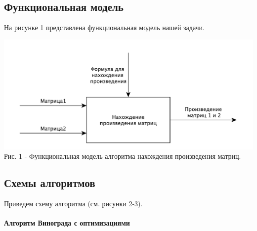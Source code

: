 \documentclass[a4paper,14pt]{article} %
\begin{document}
	\subsection{Функциональная модель}
	На рисунке 1 представлена функциональная модель нашей задачи.  
	\begin{center}
		\includegraphics[scale = 0.8]{idef0} \\ Рис.  1 - Функциональная модель алгоритма нахождения произведения матриц. 
	\end{center}
	
        
        \subsection{Схемы алгоритмов}
        \hfill
        
        Приведем схему алгоритма (см. рисунки 2-3). 
        
        \hfill

	\hfill
	\paragraph{Алгоритм Винограда с оптимизациями}
	
\end{document}

